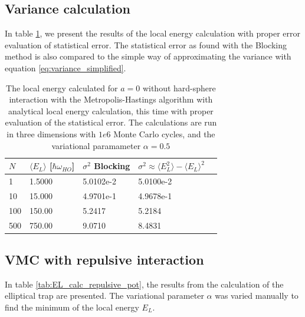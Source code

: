 \documentclass[norsk,a4paper,12pt]{article}
\begin{document}
\subsection{Variance calculation}

In table \ref{tab:variance_analysis}, we present the results of the local energy calculation with proper error evaluation of statistical error. The statistical error as found with the Blocking method is also compared to the simple way of approximating the variance with equation \ref{eq:variance_simplified}. 

\begin{table} [H]
	\caption{The local energy calculated for $a=0$  without hard-sphere interaction with the Metropolis-Hastings algorithm with analytical local energy calculation, this time with proper evaluation of the statistical error.  The calculations are run in three dimensions with $1e6$ Monte Carlo cycles, and the variational paramameter $\alpha=0.5$}
	\begin{tabularx}{\textwidth}{X|XXXX} \hline
		\label{tab:variance_analysis}
		$N$ & $\langle E_L\rangle$ [$\hbar\omega_{HO}$] & $\sigma^2$ Blocking & $\sigma^2 \approx \langle E_L^2 \rangle - \langle E_L \rangle^2$ \\ \hline
				1 & 1.5000 & 5.0102e-2  & 5.0100e-2 \\
				10 & 15.000 & 4.9701e-1 & 4.9678e-1  \\
				100 & 150.00 & 5.2417 & 5.2184\\
				500 & 750.00 & 9.0710 & 8.4831 \\ \hline
	\end{tabularx}
\end{table}

\subsection{VMC with repulsive interaction}
In table \ref{tab:EL_calc_repulsive_pot}, the results from the calculation of the elliptical trap are presented. The variational parameter $\alpha$ was varied manually to find the minimum of the local energy $E_L$.
\end{document}
